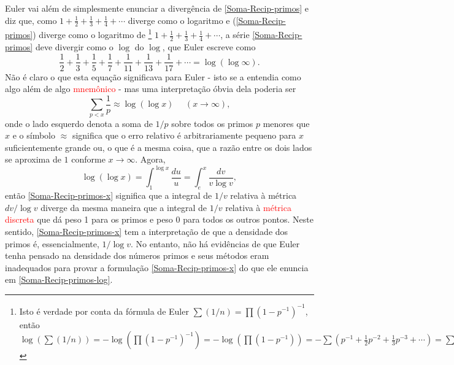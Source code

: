     Euler vai além de simplesmente enunciar a divergência de \eqref{Soma-Recip-primos} e diz que, como $1 + \frac{1}{2} + \frac{1}{3} + \frac{1}{4} + \cdots$ diverge como o logaritmo e (\ref{Soma-Recip-primos}) diverge como o logaritmo de
    \footnote
    {Isto é verdade por conta da fórmula de Euler $\sum(1/n) = \prod (1-p^{-1})^{-1}$, então $\log (\sum(1/n)) = - \log(\prod(1-p^{-1})^{-1}) = -\log(\prod(1-p^{-1})) = -\sum (p^{-1} + \frac{1}{2}p^{-2} + \frac{1}{3}p^{-3} + \cdots ) = \sum(1/p) + \text{ convergente}.$}
    $1 + \frac{1}{2} + \frac{1}{3} + \frac{1}{4} + \cdots$, a série \eqref{Soma-Recip-primos} deve divergir como o $\log$ do $\log$, que Euler escreve como 
    \begin{equation}
    \label{Soma-Recip-primos-log}
    \frac{1}{2} + \frac{1}{3} + \frac{1}{5} + \frac{1}{7} + \frac{1}{11} + \frac{1}{13} + \frac{1}{17} + \cdots = \log(\log \infty).
    \end{equation}
    Não é claro o que esta equação significava para Euler - isto se a entendia como algo além de algo \textcolor{red}{mnemônico} - mas uma interpretação óbvia dela poderia ser
    \begin{equation}
    \label{Soma-Recip-primos-x}
    \sum_{p<x}\frac{1}{p} \approx \log(\log x) \ \ \ \ \ \ (x \to \infty),
    \end{equation}
    onde o lado esquerdo denota a soma de $1/p$ sobre todos os primos $p$ menores que $x$ e o símbolo $\approx$ significa que o erro relativo é arbitrariamente pequeno para $x$ suficientemente grande ou, o que é a mesma coisa, que a razão entre os dois lados se aproxima de $1$ conforme $x \to \infty$. Agora,
    $$\log(\log x) = \int_{1}^{\log x} \frac{du}{u} = \int_{e}^{x} \frac{dv}{v\log v},$$
    então \eqref{Soma-Recip-primos-x} significa que a integral de $1/v$ relativa à métrica $dv/\log v$ diverge da mesma maneira que a integral de $1/v$ relativa à \textcolor{red}{métrica discreta} que dá peso 1 para os primos e peso 0 para todos os outros pontos. Neste sentido, \eqref{Soma-Recip-primos-x} tem a interpretação de que a densidade dos primos é, essencialmente, $1/\log v$. No entanto, não há evidências de que Euler tenha pensado na densidade dos números primos e seus métodos eram inadequados para provar a formulação \eqref{Soma-Recip-primos-x} do que ele enuncia em \eqref{Soma-Recip-primos-log}.
    
